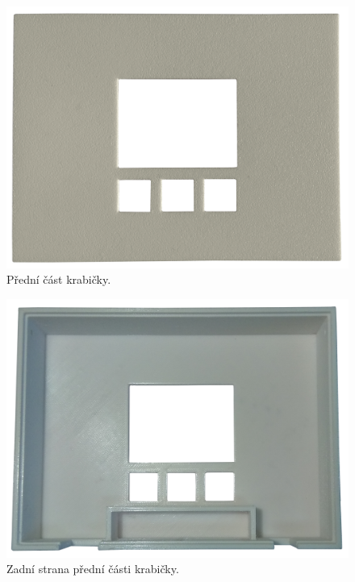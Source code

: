 \begin{figure}[H]
    \centering
    \includegraphics[width=\textwidth]{images/krabicka-nastenny-snimac-prostorove-teploty/krabicka-nastenny-snimac-prostorove-teploty-predni-strana.png}
    \caption{Přední část krabičky.}
    \label{fig:krabicka-nastenny-snimac-prostorove-teploty-predni-strana}
\end{figure}

\begin{figure}[H]
    \centering
    \includegraphics[width=\textwidth]{images/krabicka-nastenny-snimac-prostorove-teploty/krabicka-nastenny-snimac-prostorove-teploty-predni-strana-zezadu.png}
    \caption{Zadní strana přední části krabičky.}
    \label{fig:krabicka-nastenny-snimac-prostorove-teploty-predni-strana-zezadu}
\end{figure}

